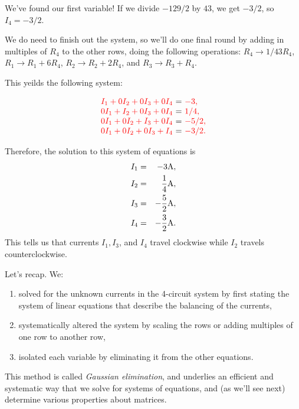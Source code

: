 \documentclass{ximera}
\begin{document}
\begin{exploration}
\begin{example}
\begin{solution}
  We've found our first variable! If we divide $-129/2$ by $43$, we get $-3/2$, so $I_4 = -3/2$.

  We do need to finish out the system, so we'll do one final round by adding in multiples of $R_4$ to the other rows, doing the following operations: $R_4\rightarrow 1/43 R_4$, $R_1 \rightarrow R_1 + 6R_4$, $R_2 \rightarrow R_2 + 2R_4$, and $R_3 \rightarrow R_3 + R_4$.

  This yeilds the following system: 

  \begin{equation*}
    \begin{array}{r@{~}c@{~}l}
      \color{red}I_1+0I_2+0I_3+0I_4&=&\color{red}-3, \\
      \color{red}0I_1+I_2 + 0I_3 +0I_4 &=& \color{red}1/4, \\
      \color{red}0I_1 + 0I_2 + I_3 + 0I_4 &=& \color{red}-5/2, \\
      \color{red}0I_1+0I_2 + 0I_3 + I_4 &=& \color{red}-3/2.
    \end{array}
  \end{equation*}


  Therefore, the solution to this system of equations is
  \begin{eqnarray*}
    I_1 &=& -3 \text{A}, \\
    I_2 &=& \frac{1}{4} \text{A}, \\
    I_3 &=& -\frac{5}{2} \text{A}, \\
    I_4 &=& -\frac{3}{2} \text{A}.
  \end{eqnarray*}
  This tells us that currents $I_1, I_3$, and $I_4$ travel clockwise
  while $I_2$ travels counterclockwise.
\end{solution}

Let's recap. We:

\begin{enumerate}

\item solved for the unknown currents in the 4-circuit system by first stating the system of linear equations that describe the balancing of the currents, 
\item systematically altered the system by scaling the rows or adding multiples of one row to another row, 
\item isolated each variable by eliminating it from the other equations.

\end{enumerate}

This method is called \emph{Gaussian elimination}, and underlies an efficient and systematic way that we solve for systems of equations, and (as we'll see next) determine various properties about matrices. 


\end{example}
\end{exploration}
\end{document}
